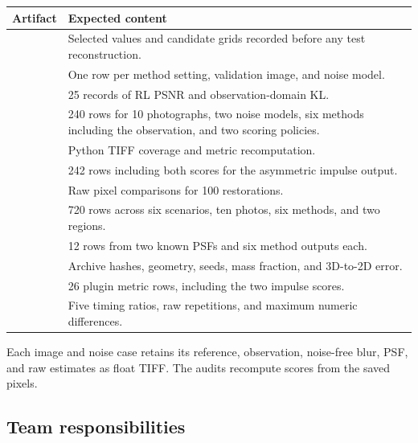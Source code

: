 \begin{center}
\small
\begin{tabularx}{\linewidth}{@{}p{.44\linewidth}Y@{}}
\toprule Artifact & Expected content\\\midrule
{} & Selected values and candidate grids recorded before any test reconstruction.\\
 & One row per method setting, validation image, and noise model.\\
 & 25 records of RL PSNR and observation-domain KL.\\
 & 240 rows for 10 photographs, two noise models, six methods including the observation, and two scoring policies.\\
 & Python TIFF coverage and metric recomputation.\\
 & 242 rows including both scores for the asymmetric impulse output.\\
 & Raw pixel comparisons for 100 restorations.\\
 & 720 rows across six scenarios, ten photos, six methods, and two regions.\\
 & 12 rows from two known PSFs and six method outputs each.\\
 & Archive hashes, geometry, seeds, mass fraction, and 3D-to-2D error.\\
 & 26 plugin metric rows, including the two impulse scores.\\
 & Five timing ratios, raw repetitions, and maximum numeric differences.\\
\bottomrule
\end{tabularx}
\end{center}

Each image and noise case retains its reference, observation, noise-free blur, PSF, and raw estimates as float TIFF. The audits recompute scores from the saved pixels.

\subsection{Team responsibilities}

